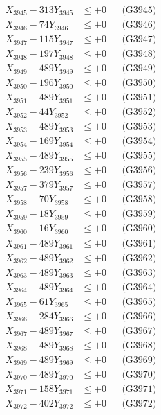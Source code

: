 \documentclass[a4paper,10pt]{article}
\begin{document}
{\begin{align}
X_{3945} - 313Y_{3945} &\leq +0 && \text{(G3945)} \\
X_{3946} - 74Y_{3946} &\leq +0 && \text{(G3946)} \\
X_{3947} - 115Y_{3947} &\leq +0 && \text{(G3947)} \\
X_{3948} - 197Y_{3948} &\leq +0 && \text{(G3948)} \\
X_{3949} - 489Y_{3949} &\leq +0 && \text{(G3949)} \\
X_{3950} - 196Y_{3950} &\leq +0 && \text{(G3950)} \\
\allowbreak
X_{3951} - 489Y_{3951} &\leq +0 && \text{(G3951)} \\
X_{3952} - 44Y_{3952} &\leq +0 && \text{(G3952)} \\
X_{3953} - 489Y_{3953} &\leq +0 && \text{(G3953)} \\
X_{3954} - 169Y_{3954} &\leq +0 && \text{(G3954)} \\
X_{3955} - 489Y_{3955} &\leq +0 && \text{(G3955)} \\
X_{3956} - 239Y_{3956} &\leq +0 && \text{(G3956)} \\
X_{3957} - 379Y_{3957} &\leq +0 && \text{(G3957)} \\
X_{3958} - 70Y_{3958} &\leq +0 && \text{(G3958)} \\
X_{3959} - 18Y_{3959} &\leq +0 && \text{(G3959)} \\
X_{3960} - 16Y_{3960} &\leq +0 && \text{(G3960)} \\
\allowbreak
X_{3961} - 489Y_{3961} &\leq +0 && \text{(G3961)} \\
X_{3962} - 489Y_{3962} &\leq +0 && \text{(G3962)} \\
X_{3963} - 489Y_{3963} &\leq +0 && \text{(G3963)} \\
X_{3964} - 489Y_{3964} &\leq +0 && \text{(G3964)} \\
X_{3965} - 61Y_{3965} &\leq +0 && \text{(G3965)} \\
X_{3966} - 284Y_{3966} &\leq +0 && \text{(G3966)} \\
X_{3967} - 489Y_{3967} &\leq +0 && \text{(G3967)} \\
X_{3968} - 489Y_{3968} &\leq +0 && \text{(G3968)} \\
X_{3969} - 489Y_{3969} &\leq +0 && \text{(G3969)} \\
X_{3970} - 489Y_{3970} &\leq +0 && \text{(G3970)} \\
\allowbreak
X_{3971} - 158Y_{3971} &\leq +0 && \text{(G3971)} \\
X_{3972} - 402Y_{3972} &\leq +0 && \text{(G3972)} \\

\end{align}}
\end{document}
